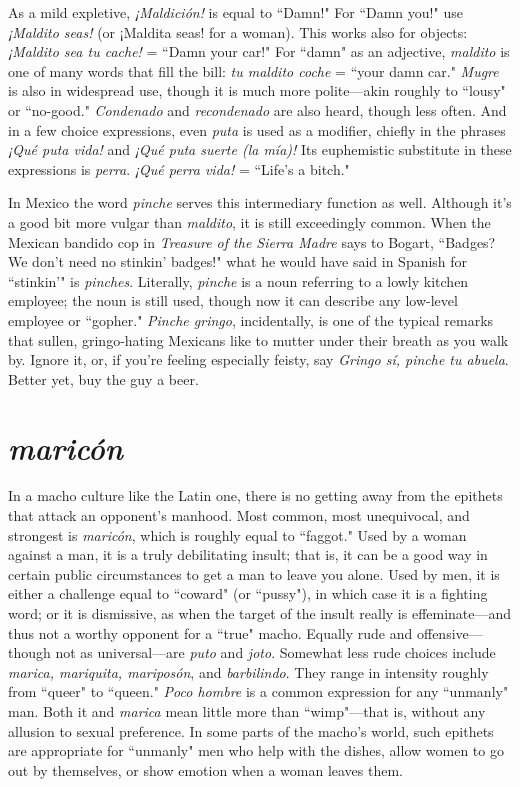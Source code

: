 As a mild expletive, \emph{¡Maldición!} is equal to ``Damn!" For
``Damn you!" use \emph{¡Maldito seas!} (or ¡Maldita seas! for a woman). This
works also for objects: \emph{¡Maldito sea tu cache!} = ``Damn your car!" For
``damn" as an adjective, \emph{maldito} is one of many words that fill the bill:
\emph{tu maldito coche} = ``your damn car." \emph{Mugre} is also in widespread use,
though it is much more polite---akin roughly to ``lousy" or ``no-good."
\emph{Condenado} and \emph{recondenado} are also heard, though less often. And in
a few choice expressions, even \emph{puta} is used as a modifier, chiefly in the
phrases \emph{¡Qué puta vida!} and \emph{¡Qué puta suerte (la mía)!} Its euphemistic substitute in these expressions is \emph{perra}. \emph{¡Qué perra vida!} = ``Life's
a bitch."

In Mexico the word \emph{pinche} serves this intermediary function
as well. Although it's a good bit more vulgar than \emph{maldito}, it is still
exceedingly common. When the Mexican bandido cop in \emph{Treasure of
	the Sierra Madre} says to Bogart, ``Badges? We don't need no stinkin'
badges!" what he would have said in Spanish for ``stinkin'" is \emph{pinches}.
Literally, \emph{pinche} is a noun referring to a lowly kitchen employee; the
noun is still used, though now it can describe any low-level employee
or ``gopher." \emph{Pinche gringo}, incidentally, is one of the typical remarks
that sullen, gringo-hating Mexicans like to mutter under their breath
as you walk by. Ignore it, or, if you're feeling especially feisty, say
\emph{Gringo sí, pinche tu abuela}. Better yet, buy the guy a beer.

\section{\emph{maricón}}

In a macho culture like the Latin one, there is no getting away
from the epithets that attack an opponent's manhood. Most common,
most unequivocal, and strongest is \emph{maricón}, which is roughly equal to
``faggot." Used by a woman against a man, it is a truly debilitating insult; that is, it can be a good way in certain public circumstances to get
a man to leave you alone. Used by men, it is either a challenge equal to
``coward" (or ``pussy"), in which case it is a fighting word; or it is dismissive, as when the target of the insult really is effeminate---and thus
not a worthy opponent for a ``true" macho. Equally rude and offensive---though not as universal---are \emph{puto} and \emph{joto}. Somewhat less rude
choices include \emph{marica, mariquita, mariposón}, and \emph{barbilindo}. They
range in intensity roughly from ``queer" to ``queen." \emph{Poco hombre} is a
common expression for any ``unmanly" man. Both it and \emph{marica} mean
little more than ``wimp"---that is, without any allusion to sexual preference. In some parts of the macho's world, such epithets are appropriate for ``unmanly" men who help with the dishes, allow women to go
out by themselves, or show emotion when a woman leaves them.

